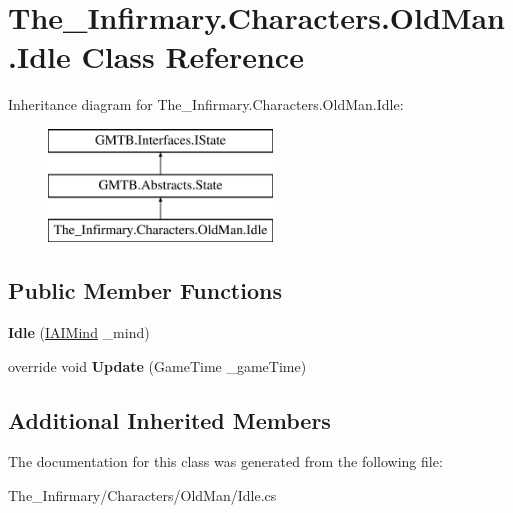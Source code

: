 \hypertarget{class_the___infirmary_1_1_characters_1_1_old_man_1_1_idle}{}\section{The\+\_\+\+Infirmary.\+Characters.\+Old\+Man.\+Idle Class Reference}
\label{class_the___infirmary_1_1_characters_1_1_old_man_1_1_idle}
Inheritance diagram for The\+\_\+\+Infirmary.\+Characters.\+Old\+Man.\+Idle\+:\begin{figure}[H]
\begin{center}
\leavevmode
\includegraphics[height=3.000000cm]{class_the___infirmary_1_1_characters_1_1_old_man_1_1_idle}
\end{center}
\end{figure}
\subsection*{Public Member Functions}
\begin{DoxyCompactItemize}
\item 
\mbox{\label{class_the___infirmary_1_1_characters_1_1_old_man_1_1_idle_afa8ed94d6a2e9346496f434afa299440}} 
{\bfseries Idle} (\mbox{\hyperlink{interface_g_m_t_b_1_1_interfaces_1_1_i_a_i_mind}{I\+A\+I\+Mind}} \+\_\+mind)
\item 
\mbox{\label{class_the___infirmary_1_1_characters_1_1_old_man_1_1_idle_aeb741f211c27e2bb6244eaac73b3d7a8}} 
override void {\bfseries Update} (Game\+Time \+\_\+game\+Time)
\end{DoxyCompactItemize}
\subsection*{Additional Inherited Members}


The documentation for this class was generated from the following file\+:\begin{DoxyCompactItemize}
\item 
The\+\_\+\+Infirmary/\+Characters/\+Old\+Man/Idle.\+cs\end{DoxyCompactItemize}
